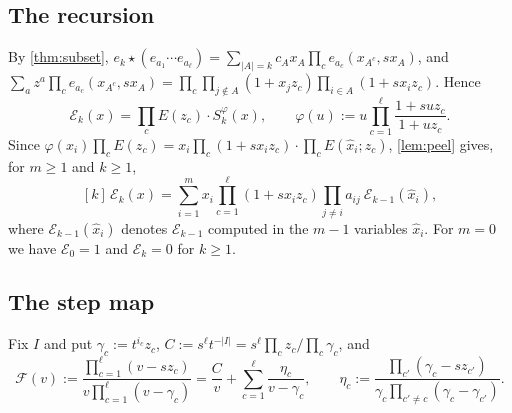 \documentclass[11pt]{amsart}
\theoremstyle{definition}
\theoremstyle{remark}
\numberwithin{equation}{section}
\newcommand{\hx}{\hat x}
\begin{document}
\subsection{The recursion}
By \cref{thm:subset}, $e_k\star(e_{a_1}\cdots e_{a_\ell})=\sum_{|A|=k}c_Ax_A\prod_ce_{a_c}(x_{A^c},sx_A)$, and $\sum_{a}z^a\prod_ce_{a_c}(x_{A^c},sx_A)=\prod_c\prod_{j\notin A}(1+x_jz_c)\prod_{i\in A}(1+sx_iz_c)$. Hence
\begin{equation}\label{eq:Gamma}
\mathcal E_k(x)=\prod_cE(z_c)\cdot S^\varphi_k(x),\qquad \varphi(u):=u\prod_{c=1}^\ell\frac{1+suz_c}{1+uz_c}.
\end{equation}
Since $\varphi(x_i)\prod_cE(z_c)=x_i\prod_c(1+sx_iz_c)\cdot\prod_cE(\hx_i;z_c)$, \cref{lem:peel} gives, for $m\ge1$ and $k\ge1$,
\begin{equation}\label{eq:Rl}
[k]\,\mathcal E_k(x)=\sum_{i=1}^mx_i\prod_{c=1}^\ell(1+sx_iz_c)\prod_{j\neq i}a_{ij}\ \mathcal E_{k-1}(\hx_i),
\end{equation}
where $\mathcal E_{k-1}(\hx_i)$ denotes $\mathcal E_{k-1}$ computed in the $m-1$ variables $\hx_i$. For $m=0$ we have $\mathcal E_0=1$ and $\mathcal E_k=0$ for $k\ge1$.

\subsection{The step map}
Fix $I$ and put $\gamma_c:=t^{i_c}z_c$, $C:=s^\ell t^{-|I|}=s^\ell\prod_cz_c/\prod_c\gamma_c$, and
\[ \mathcal{F}(v):=\frac{\prod_{c=1}^\ell(v-sz_c)}{v\prod_{c=1}^\ell(v-\gamma_c)}=\frac{C}{v}+\sum_{c=1}^\ell\frac{\eta_c}{v-\gamma_c},\qquad \eta_c:=\frac{\prod_{c'}(\gamma_c-sz_{c'})}{\gamma_c\prod_{c'\neq c}(\gamma_c-\gamma_{c'})}. \]
\end{document}
